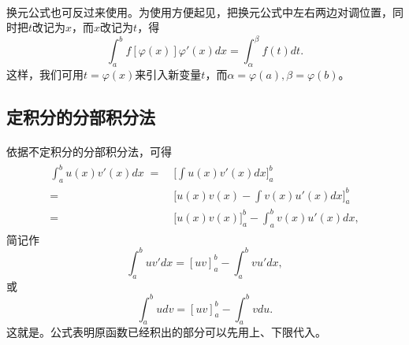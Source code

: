 \paragraph{}
换元公式也可反过来使用。为使用方便起见，把换元公式中左右两边对调位置，同时把$t$改记为$x$，而$x$改记为$t$，得
\begin{equation}
  \int_a^bf[\varphi(x)]\varphi'(x)dx = \int_\alpha^\beta f(t)dt.
\end{equation}
这样，我们可用$t=\varphi(x)$来引入新变量$t$，而$\alpha = \varphi(a), \beta = \varphi(b)$。

\subsection{定积分的分部积分法}
\paragraph{}
依据不定积分的分部积分法，可得
\begin{align}
\begin{split}
  \int_a^bu(x)v'(x)dx \;=&\; \big[ \int u(x)v'(x)dx \big]_a^b \\
    =&\; \big[ u(x)v(x) - \int v(x)u'(x)dx \big]_a^b \\
    =&\; \big[ u(x)v(x) \big]_a^b - \int_a^b v(x)u'(x)dx,
\end{split}
\end{align}
简记作
\begin{equation}
  \int_a^buv'dx = [uv]_a^b - \int_a^bvu'dx,
\end{equation}
或
\begin{equation}
  \int_a^budv = [uv]_a^b - \int_a^bvdu.
\end{equation}
这就是。公式表明原函数已经积出的部分可以先用上、下限代入。
